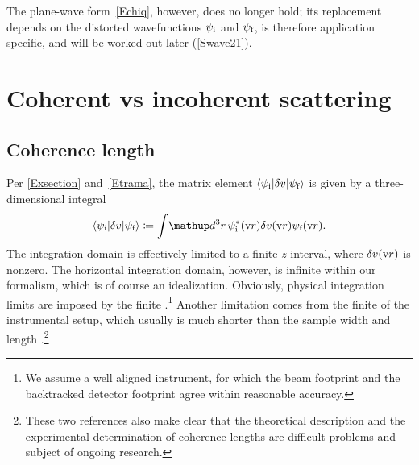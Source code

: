 The plane-wave form~\cref{Echiq}, however, does no longer hold;
its replacement depends on the distorted wavefunctions
$\psi_\si$ and $\psi_\sf$,
is therefore application specific,
and will be worked out later (\cref{Swave21}).

%


\section{Coherent vs incoherent scattering}\label{Scoherlen}

\subsection{Coherence length}

Per \cref{Exsection} and~\cref{Etrama},
%
the matrix element $\bra \psi_\si|\delta v|\psi_\sf\ket$
is given by a three-dimensional integral
\begin{equation}\label{Etrama3}
  \bra \psi_\si|\delta v|\psi_\sf\ket
  \coloneqq  \int\!\d^3r\, \psi^{*}_\si(\r)\delta v(\r)\psi_\sf(\r).
\end{equation}
The integration domain is effectively limited to a finite $z$ interval,
where $\delta v(\r)$ is nonzero.
The horizontal integration domain, however, is infinite
within our formalism,
which is of course an idealization.
Obviously, physical integration limits are imposed by the finite
%
.\footnote
{We assume a well aligned instrument,
for which the beam footprint and the backtracked detector footprint
%
%
%
agree within reasonable accuracy.}
Another limitation comes from the finite 
of the instrumental setup,
which usually is much shorter than the sample width and length
\cite{HaPR10,MaMM14}.\footnote
{These two references also make clear that
  the theoretical description and the experimental determination of
  coherence lengths are difficult problems and subject of ongoing research.}

